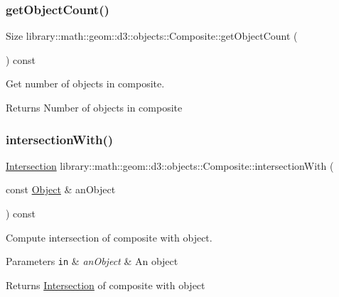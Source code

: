 \subsubsection{\texorpdfstring{get\+Object\+Count()}{getObjectCount()}}
{\footnotesize\ttfamily Size library\+::math\+::geom\+::d3\+::objects\+::\+Composite\+::get\+Object\+Count (\begin{DoxyParamCaption}{ }\end{DoxyParamCaption}) const}



Get number of objects in composite. 

\begin{DoxyReturn}{Returns}
Number of objects in composite 
\end{DoxyReturn}
\mbox{\label{classlibrary_1_1math_1_1geom_1_1d3_1_1objects_1_1_composite_a5af4610cb68cb31bc5be14c06829c116}} 
\subsubsection{\texorpdfstring{intersection\+With()}{intersectionWith()}\hspace{0.1cm}{\footnotesize\ttfamily [1/2]}}
{\footnotesize\ttfamily \hyperlink{classlibrary_1_1math_1_1geom_1_1d3_1_1_intersection}{Intersection} library\+::math\+::geom\+::d3\+::objects\+::\+Composite\+::intersection\+With (\begin{DoxyParamCaption}\item[{const \hyperlink{classlibrary_1_1math_1_1geom_1_1d3_1_1_object}{Object} \&}]{an\+Object }\end{DoxyParamCaption}) const\hspace{0.3cm}{\ttfamily [virtual]}}



Compute intersection of composite with object. 


\begin{DoxyParams}[1]{Parameters}
\mbox{\tt in}  & {\em an\+Object} & An object \\
\hline
\end{DoxyParams}
\begin{DoxyReturn}{Returns}
\hyperlink{classlibrary_1_1math_1_1geom_1_1d3_1_1_intersection}{Intersection} of composite with object 
\end{DoxyReturn}


